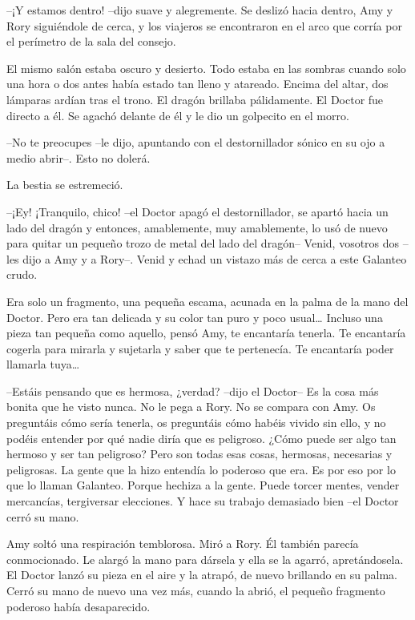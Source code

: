 {--¡Y estamos dentro! --dijo suave y alegremente. Se deslizó hacia
	dentro, Amy y Rory siguiéndole de cerca, y los viajeros se encontraron
en el arco que corría por el perímetro de la sala del consejo.}

{El mismo salón estaba oscuro y desierto. Todo estaba en las sombras
	cuando solo una hora o dos antes había estado tan lleno y atareado.
	Encima del altar, dos lámparas ardían tras el trono. El dragón brillaba
	pálidamente. El Doctor fue directo a él. Se agachó delante de él y le
dio un golpecito en el morro.}

{--No te preocupes --le dijo, apuntando con el destornillador sónico
en su ojo a medio abrir--. Esto no dolerá.}

{La bestia se estremeció.}

{--¡Ey! ¡Tranquilo, chico! --el Doctor apagó el destornillador, se
	apartó hacia un lado del dragón y entonces, amablemente, muy
	amablemente, lo usó de nuevo para quitar un pequeño trozo de metal del
	lado del dragón-- Venid, vosotros dos --les dijo a Amy y a Rory--. Venid
y echad un vistazo más de cerca a este Galanteo crudo.}

{Era solo un fragmento, una pequeña escama, acunada en la palma de la
	mano del Doctor. Pero era tan delicada y su color tan puro y poco
	usual\ldots{} Incluso una pieza tan pequeña como aquello, pensó Amy, te
	encantaría tenerla. Te encantaría cogerla para mirarla y sujetarla y
	saber que te pertenecía. Te encantaría poder llamarla tuya\ldots{}}

{--Estáis pensando que es hermosa, ¿verdad? --dijo el Doctor-- Es la
	cosa más bonita que he visto nunca. No le pega a Rory. No se compara con
	Amy. Os preguntáis cómo sería tenerla, os preguntáis cómo habéis vivido
	sin ello, y no podéis entender por qué nadie diría que es peligroso.
	¿Cómo puede ser algo tan hermoso y ser tan peligroso? Pero son todas
	esas cosas, hermosas, necesarias y peligrosas. La gente que la hizo
	entendía lo poderoso que era. Es por eso por lo que lo llaman Galanteo.
	Porque hechiza a la gente. Puede torcer mentes, vender mercancías,
	tergiversar elecciones. Y hace su trabajo demasiado bien --el Doctor
cerró su mano.}

{Amy soltó una respiración temblorosa. Miró a Rory. Él también parecía
	conmocionado. Le alargó la mano para dársela y ella se la agarró,
	apretándosela. El Doctor lanzó su pieza en el aire y la atrapó, de nuevo
	brillando en su palma. Cerró su mano de nuevo una vez más, cuando la
abrió, el pequeño fragmento poderoso había desaparecido.}


